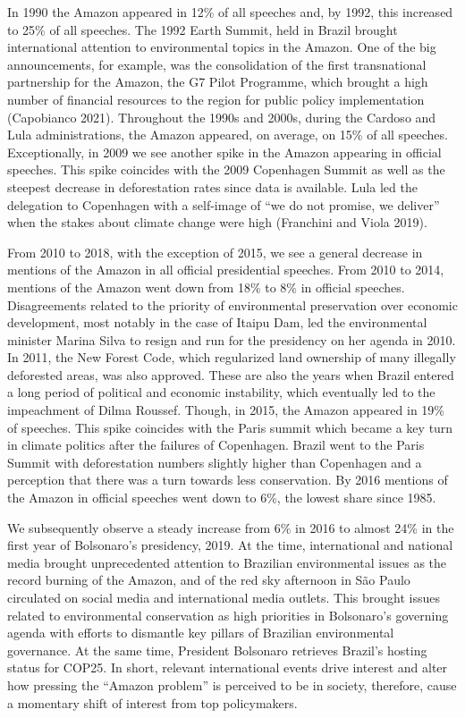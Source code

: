 \documentclass[
]{article}
\begin{document}
In 1990 the Amazon appeared in 12\% of all speeches and, by 1992, this
increased to 25\% of all speeches. The 1992 Earth Summit, held in Brazil
brought international attention to environmental topics in the Amazon.
One of the big announcements, for example, was the consolidation of the
first transnational partnership for the Amazon, the G7 Pilot Programme,
which brought a high number of financial resources to the region for
public policy implementation (Capobianco 2021). Throughout the 1990s and
2000s, during the Cardoso and Lula administrations, the Amazon appeared,
on average, on 15\% of all speeches. Exceptionally, in 2009 we see
another spike in the Amazon appearing in official speeches. This spike
coincides with the 2009 Copenhagen Summit as well as the steepest
decrease in deforestation rates since data is available. Lula led the
delegation to Copenhagen with a self-image of ``we do not promise, we
deliver'' when the stakes about climate change were high (Franchini and
Viola 2019).

From 2010 to 2018, with the exception of 2015, we see a general decrease
in mentions of the Amazon in all official presidential speeches. From
2010 to 2014, mentions of the Amazon went down from 18\% to 8\% in
official speeches. Disagreements related to the priority of
environmental preservation over economic development, most notably in
the case of Itaipu Dam, led the environmental minister Marina Silva to
resign and run for the presidency on her agenda in 2010. In 2011, the
New Forest Code, which regularized land ownership of many illegally
deforested areas, was also approved. These are also the years when
Brazil entered a long period of political and economic instability,
which eventually led to the impeachment of Dilma Roussef. Though, in
2015, the Amazon appeared in 19\% of speeches. This spike coincides with
the Paris summit which became a key turn in climate politics after the
failures of Copenhagen. Brazil went to the Paris Summit with
deforestation numbers slightly higher than Copenhagen and a perception
that there was a turn towards less conservation. By 2016 mentions of the
Amazon in official speeches went down to 6\%, the lowest share since
1985.

We subsequently observe a steady increase from 6\% in 2016 to almost
24\% in the first year of Bolsonaro's presidency, 2019. At the time,
international and national media brought unprecedented attention to
Brazilian environmental issues as the record burning of the Amazon, and
of the red sky afternoon in São Paulo circulated on social media and
international media outlets. This brought issues related to
environmental conservation as high priorities in Bolsonaro's governing
agenda with efforts to dismantle key pillars of Brazilian environmental
governance. At the same time, President Bolsonaro retrieves Brazil's
hosting status for COP25. In short, relevant international events drive
interest and alter how pressing the ``Amazon problem'' is perceived to
be in society, therefore, cause a momentary shift of interest from top
policymakers.
\end{document}
